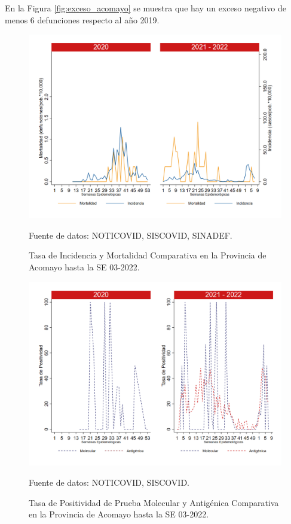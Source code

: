 \documentclass[12pt,a4paper,openany]{book}
\begin{document}
		 En la Figura \ref{fig:exceso_acomayo} se muestra que hay un exceso negativo de menos 6 defunciones respecto al año 2019.
		
		\begin{figure}[h]
			\caption{Tasa de Incidencia y Mortalidad Comparativa en la Provincia de Acomayo hasta la SE 03-2022.}\label{fig:inc_mort_acomayo}
			\begin{center}
				\includegraphics[width=0.65\linewidth]{../figuras/incidencia_mortalidad_20_21_1.png}
			\end{center}
			{\footnotesize {Fuente de datos: NOTICOVID, SISCOVID, SINADEF.}}
		\end{figure}
		
		\begin{figure}[h]
			\caption{Tasa de Positividad de Prueba Molecular y Antigénica Comparativa en la Provincia de Acomayo hasta la SE 03-2022. }\label{fig:positividad_acomayo}
			\begin{center}
				\includegraphics[width=0.7\linewidth]{../figuras/positividad_20_21_1.png}
			\end{center}
			{\footnotesize {Fuente de datos: NOTICOVID, SISCOVID.}}
		\end{figure}
		
\end{document}
